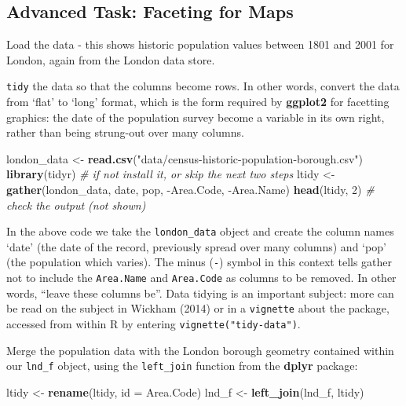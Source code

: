 \documentclass[]{article}
\newenvironment{Shaded}{}{}
\newcommand{\KeywordTok}[1]{\textcolor[rgb]{0.00,0.44,0.13}{\textbf{{#1}}}}
\newcommand{\DataTypeTok}[1]{\textcolor[rgb]{0.56,0.13,0.00}{{#1}}}
\newcommand{\DecValTok}[1]{\textcolor[rgb]{0.25,0.63,0.44}{{#1}}}
\newcommand{\StringTok}[1]{\textcolor[rgb]{0.25,0.44,0.63}{{#1}}}
\newcommand{\CommentTok}[1]{\textcolor[rgb]{0.38,0.63,0.69}{\textit{{#1}}}}
\newcommand{\NormalTok}[1]{{#1}}
\begin{document}
\subsection{Advanced Task: Faceting for
Maps}\label{advanced-task-faceting-for-maps}

Load the data - this shows historic population values between 1801 and
2001 for London, again from the London data store.

\texttt{tidy} the data so that the columns become rows. In other words,
convert the data from `flat' to `long' format, which is the form
required by \textbf{ggplot2} for facetting graphics: the date of the
population survey become a variable in its own right, rather than being
strung-out over many columns.

\begin{Shaded}
\begin{Highlighting}[]
\NormalTok{london_data <-}\StringTok{ }\KeywordTok{read.csv}\NormalTok{(}\StringTok{"data/census-historic-population-borough.csv"}\NormalTok{)}
\KeywordTok{library}\NormalTok{(tidyr) }\CommentTok{# if not install it, or skip the next two steps}
\NormalTok{ltidy <-}\StringTok{ }\KeywordTok{gather}\NormalTok{(london_data, date, pop, -Area.Code, -Area.Name)}
\KeywordTok{head}\NormalTok{(ltidy, }\DecValTok{2}\NormalTok{) }\CommentTok{# check the output (not shown)}
\end{Highlighting}
\end{Shaded}

In the above code we take the \texttt{london\_data} object and create
the column names `date' (the date of the record, previously spread over
many columns) and `pop' (the population which varies). The minus
(\texttt{-}) symbol in this context tells gather not to include the
\texttt{Area.Name} and \texttt{Area.Code} as columns to be removed. In
other words, ``leave these columns be''. Data tidying is an important
subject: more can be read on the subject in Wickham (2014) or in a
\texttt{vignette} about the package, accessed from within R by entering
\texttt{vignette("tidy-data")}.

Merge the population data with the London borough geometry contained
within our \texttt{lnd\_f} object, using the \texttt{left\_join}
function from the \textbf{dplyr} package:

\begin{Shaded}
\begin{Highlighting}[]
\NormalTok{ltidy <-}\StringTok{ }\KeywordTok{rename}\NormalTok{(ltidy, }\DataTypeTok{id =} \NormalTok{Area.Code)}
\NormalTok{lnd_f <-}\StringTok{ }\KeywordTok{left_join}\NormalTok{(lnd_f, ltidy)}
\end{Highlighting}
\end{Shaded}
\end{document}
